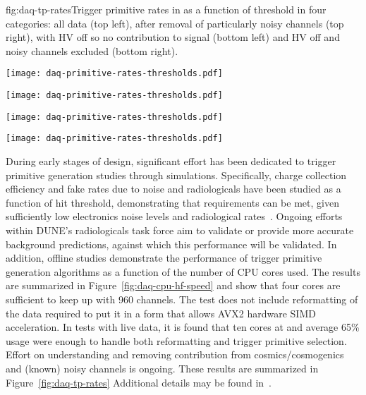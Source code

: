 \begin{dunefigure}{fig:daq-tp-rates}{Trigger primitive rates in  as a function of threshold in four categories: all data (top left),  after removal of particularly noisy channels (top right), with HV off so no contribution to signal (bottom left) and HV off and noisy channels excluded (bottom right).}
  \begin{minipage}[b]{0.5\linewidth}
    \begin{center}
      \texttt{[image: daq-primitive-rates-thresholds.pdf]}

      \texttt{[image: daq-primitive-rates-thresholds.pdf]}
    \end{center}
  \end{minipage}%
  \begin{minipage}[b]{0.5\linewidth}
    \begin{center}
      \texttt{[image: daq-primitive-rates-thresholds.pdf]}

      \texttt{[image: daq-primitive-rates-thresholds.pdf]}
    \end{center}
  \end{minipage}

\end{dunefigure}


During early stages of design, significant effort has been dedicated to
trigger primitive generation studies through simulations.
Specifically, charge collection efficiency and fake rates due to noise
and radiologicals have been studied as a function of hit threshold,
demonstrating that requirements can be met, given sufficiently low
electronics noise levels and radiological rates~\cite{bib:docdb11236}. 
Ongoing efforts within DUNE's radiologicals task force aim to validate
or provide more accurate background predictions, against which this
performance will be validated.
In addition, offline studies demonstrate the performance of trigger
primitive generation algorithms as a function of the number of CPU cores
used.  
The results are summarized in Figure~\ref{fig:daq-cpu-hf-speed} and show
that four cores are sufficient to keep up with 960 channels.
The test does not include reformatting of the data required to put it in
a form that allows AVX2 hardware SIMD acceleration.
In tests with live  data, it is found that ten cores at
and average 65\% usage were enough to handle both reformatting and
trigger primitive selection. 
Effort on understanding and removing contribution
from cosmics/cosmogenics and (known) noisy channels is ongoing.
These results are summarized in Figure~\ref{fig:daq-tp-rates}
Additional details may be found in~.

